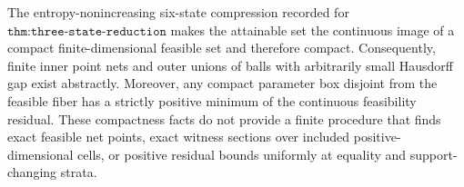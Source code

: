 The entropy-nonincreasing six-state compression recorded for \(\texttt{thm:three-state-reduction}\) makes the attainable set the continuous image of a compact finite-dimensional feasible set and therefore compact.  Consequently, finite inner point nets and outer unions of balls with arbitrarily small Hausdorff gap exist abstractly.  Moreover, any compact parameter box disjoint from the feasible fiber has a strictly positive minimum of the continuous feasibility residual.  These compactness facts do not provide a finite procedure that finds exact feasible net points, exact witness sections over included positive-dimensional cells, or positive residual bounds uniformly at equality and support-changing strata.